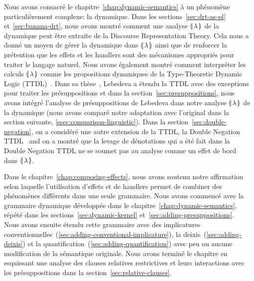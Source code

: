 Nous avons consacré le chapitre~\ref{chap:dynamic-semantics} à un phénomène
particulièrement complexe: la dynamique. Dans les sections~\ref{sec:drt-as-pl}
et~\ref{sec:banana-drt}, nous avons montré comment une analyse ${\llparenthesis \, \lambda \, \rrparenthesis}$ de la
dynamique peut être extraite de la Discourse Representation Theory. Cela nous a
donné un moyen de gérer la dynamique dans ${\llparenthesis \, \lambda \, \rrparenthesis}$ ainsi que de renforcer la
prétention que les effets et les handlers sont des mécanismes appropriés pour
traiter le langage naturel. Nous avons également montré comment interpréter les
calculs ${\llparenthesis \, \lambda \, \rrparenthesis}$ comme les propositions dynamiques de la Type-Theoretic Dynamic
Logic (TTDL)~\cite{de2006towards}. Dans sa thèse~\cite{lebedeva2012expression},
Lebedeva a étendu la TTDL avec des exceptions pour traiter les présuppositions
et dans la section~\ref{sec:presuppositions}, nous avons intégré l'analyse de
présuppositions de Lebedeva dans notre analyse ${\llparenthesis \, \lambda \, \rrparenthesis}$ de la dynamique (nous
avons comparé notre adaptation avec l'original dans la section suivante,
\ref{ssec:comparison-linguistic}). Dans la section~\ref{sec:double-negation}, on
a considéré une autre extension de la TTDL, la Double Negation
TTDL~\cite{qian2014accessibility} and on a montré que la levage de dénotations
qui a été fait dans la Double Negation TTDL ne se soumet pas au analyse comme un
effet de bord dans ${\llparenthesis \, \lambda \, \rrparenthesis}$.

Dans le chapitre~\ref{chap:composing-effects}, nous avons soutenu notre
affirmation selon laquelle l'utilisation d'effets et de handlers permet de
combiner des phénomènes différents dans une seule grammaire. Nous avons commencé
avec la grammaire dynamique développée dans le
chapitre~\ref{chap:dynamic-semantics}, répété dans les
sections~\ref{sec:dynamic-kernel} et~\ref{sec:adding-presuppositions}. Nous
avons ensuite étendu cette grammaire avec des implicatures
conventionnelles~(\ref{sec:adding-conventional-implicature}), la
deixis~(\ref{sec:adding-deixis}) et la
quantification~(\ref{sec:adding-quantification}) avec peu ou aucune modification
de la sémantique originale. Nous avons terminé le chapitre en esquissant une
analyse des clauses relatives restrictives et leurs interactions avec les
présuppositions dans la section~\ref{sec:relative-clauses}.